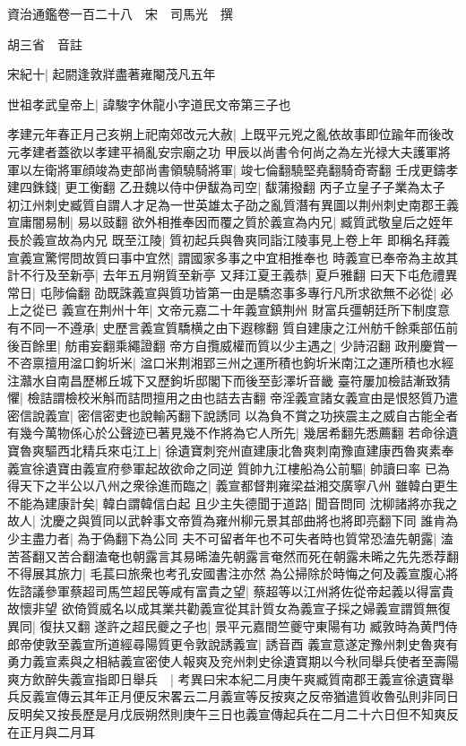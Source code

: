 資治通鑑卷一百二十八　宋　司馬光　撰

胡三省　音註

宋紀十|{
	起閼逢敦牂盡著雍閹茂凡五年}


世祖孝武皇帝上|{
	諱駿字休龍小字道民文帝第三子也}


孝建元年春正月己亥朔上祀南郊改元大赦|{
	上既平元兇之亂依故事即位踰年而後改元孝建者蓋欲以孝建平禍亂安宗廟之功}
甲辰以尚書令何尚之為左光禄大夫護軍將軍以左衛將軍顔竣為吏部尚書領驍騎將軍|{
	竣七倫翻驍堅堯翻騎奇寄翻}
壬戌更鑄孝建四銖錢|{
	更工衡翻}
乙丑魏以侍中伊馛為司空|{
	馛蒲撥翻}
丙子立皇子子業為太子　初江州刺史臧質自謂人才足為一世英雄太子劭之亂質潛有異圖以荆州刺史南郡王義宣庸闇易制|{
	易以豉翻}
欲外相推奉因而覆之質於義宣為内兄|{
	臧質武敬皇后之姪年長於義宣故為内兄}
既至江陵|{
	質初起兵與魯爽同詣江陵事見上卷上年}
即稱名拜義宣義宣驚愕問故質曰事中宜然|{
	謂國家多事之中宜相推奉也}
時義宣已奉帝為主故其計不行及至新亭|{
	去年五月朔質至新亭}
又拜江夏王義恭|{
	夏戶雅翻}
曰天下屯危禮異常日|{
	屯陟倫翻}
劭既誅義宣與質功皆第一由是驕恣事多專行凡所求欲無不必從|{
	必上之從已}
義宣在荆州十年|{
	文帝元嘉二十年義宣鎮荆州}
財富兵彊朝廷所下制度意有不同一不遵承|{
	史歷言義宣質驕横之由下遐稼翻}
質自建康之江州舫千餘乘部伍前後百餘里|{
	舫甫妄翻乘繩證翻}
帝方自攬威權而質以少主遇之|{
	少詩沼翻}
政刑慶賞一不咨禀擅用湓口鉤圻米|{
	湓口米荆湘郢三州之運所積也鉤圻米南江之運所積也水經注灨水自南昌歷郴丘城下又歷鉤圻邸閣下而後至彭澤圻音畿}
臺符屢加檢詰漸致猜懼|{
	檢詰謂檢校米斛而詰問擅用之由也詰去吉翻}
帝淫義宣諸女義宣由是恨怒質乃遣密信說義宣|{
	密信密吏也說輸芮翻下說誘同}
以為負不賞之功挾震主之威自古能全者有幾今萬物係心於公聲迹已著見幾不作將為它人所先|{
	幾居希翻先悉薦翻}
若命徐遺寶魯爽驅西北精兵來屯江上|{
	徐遺寶刺兖州直建康北魯爽刺南豫直建康西魯爽素奉義宣徐遺寶由義宣府參軍起故欲命之同逆}
質帥九江樓船為公前驅|{
	帥讀曰率}
已為得天下之半公以八州之衆徐進而臨之|{
	義宣都督荆雍梁益湘交廣寧八州}
雖韓白更生不能為建康計矣|{
	韓白謂韓信白起}
且少主失德聞于道路|{
	聞音問同}
沈柳諸將亦我之故人|{
	沈慶之與質同以武幹事文帝質為雍州柳元景其部曲將也將即亮翻下同}
誰肯為少主盡力者|{
	為于偽翻下為公同}
夫不可留者年也不可失者時也質常恐溘先朝露|{
	溘苦荅翻又苦合翻溘奄也朝露言其易晞溘先朝露言奄然而死在朝露未晞之先先悉荐翻}
不得展其旅力|{
	毛萇曰旅衆也考孔安國書注亦然}
為公掃除於時悔之何及義宣腹心將佐諮議參軍蔡超司馬竺超民等咸有富貴之望|{
	蔡超等以江州將佐從帝起義以得富貴故懷非望}
欲倚質威名以成其業共勸義宣從其計質女為義宣子採之婦義宣謂質無復異同|{
	復扶又翻}
遂許之超民夔之子也|{
	景平元嘉間竺夔守東陽有功}
臧敦時為黄門侍郎帝使敦至義宣所道經尋陽質更令敦說誘義宣|{
	誘音酉}
義宣意遂定豫州刺史魯爽有勇力義宣素與之相結義宣密使人報爽及兖州刺史徐遺寶期以今秋同舉兵使者至壽陽爽方飲醉失義宣指即日舉兵　|{
	考異曰宋本紀二月庚午爽臧質南郡王義宣徐遺寶舉兵反義宣傳云其年正月便反宋畧云二月義宣等反按爽之反帝猶遣質收魯弘則非同日反明矣又按長歷是月戊辰朔然則庚午三日也義宣傳起兵在二月二十六日但不知爽反在正月與二月耳}
